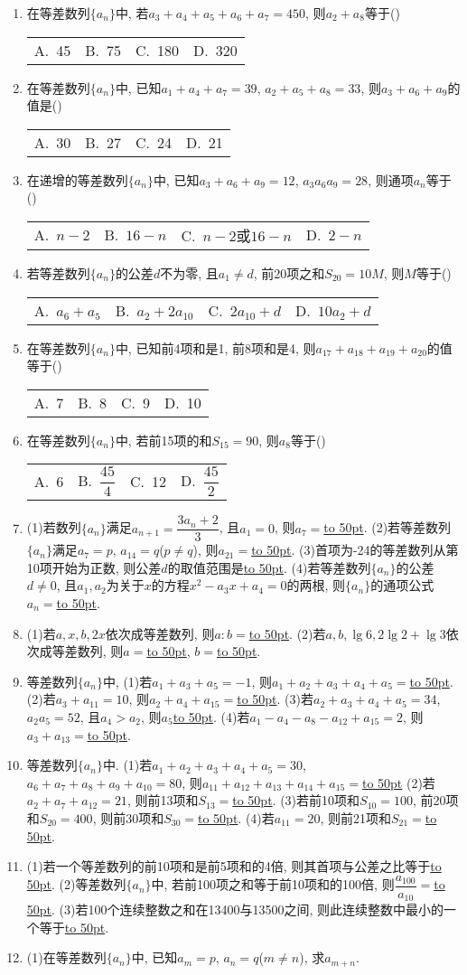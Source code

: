 \documentclass[10pt,a4paper]{article}
\newcommand{\blank}[1]{\underline{\hbox to #1pt{}}}
\newcommand{\fourch}[4]{\par\begin{tabular}{p{.23\textwidth}p{.23\textwidth}p{.23\textwidth}p{.23\textwidth}}
A.~#1 &B.~#2& C.~#3& D.~#4
\end{tabular}}
\begin{document}
\begin{enumerate}[1.]
\fourch{$2n-5$}{$2n-3$}{$2n-1$}{$2n+1$}
\item 在等差数列$\{a_n\}$中, 若$a_3+a_4+a_5+a_6+a_7=450$, 则$a_2+a_8$等于()
\fourch{45}{75}{180}{320}
\item 在等差数列$\{a_n\}$中, 已知$a_1+a_4+a_7=39$, $a_2+a_5+a_8=33$, 则$a_3+a_6+a_9$的值是()
\fourch{30}{27}{24}{21}
\item 在递增的等差数列$\{a_n\}$中, 已知$a_3+a_6+a_9=12$, $a_3a_6a_9=28$, 则通项$a_n$等于()
\fourch{$n-2$}{$16-n$}{$n-2$或$16-n$}{$2-n$}
\item 若等差数列$\{a_n\}$的公差$d$不为零, 且$a_1\ne d$, 前20项之和$S_{20}=10M$, 则$M$等于()
\fourch{$a_6+a_5$}{$a_2+2a_{10}$}{$2a_{10}+d$}{$10a_2+d$}
\item 在等差数列$\{a_n\}$中, 已知前4项和是1, 前8项和是4, 则$a_{17}+a_{18}+a_{19}+a_{20}$的值等于()
\fourch{7}{8}{9}{10}
\item 在等差数列$\{a_n\}$中, 若前15项的和$S_{15}=90$, 则$a_8$等于()
\fourch{6}{$\dfrac{45}4$}{12}{$\dfrac{45}2$}
\item (1)若数列$\{a_n\}$满足$a_{n+1}=\dfrac{3a_n+2}3$, 且$a_1=0$, 则$a_7=$\blank{50}.
(2)若等差数列$\{a_n\}$满足$a_7=p$, $a_{14}=q$($p\ne q$), 则$a_{21}=$\blank{50}.
(3)首项为-24的等差数列从第10项开始为正数, 则公差$d$的取值范围是\blank{50}.
(4)若等差数列$\{a_n\}$的公差$d\ne 0$, 且$a_1,a_2$为关于$x$的方程$x^2-a_3x+a_4=0$的两根, 则$\{a_n\}$的通项公式$a_n=$\blank{50}.
\item (1)若$a,x,b,2x$依次成等差数列, 则$a:b=$\blank{50}.
(2)若$a,b,\lg 6,2\lg 2+\lg 3$依次成等差数列, 则$a=$\blank{50}, $b=$\blank{50}.
\item 等差数列$\{a_n\}$中,
(1)若$a_1+a_3+a_5=-1$, 则$a_1+a_2+a_3+a_4+a_5=$\blank{50}.
(2)若$a_3+a_{11}=10$, 则$a_2+a_4+a_{15}=$\blank{50}.
(3)若$a_2+a_3+a_4+a_5=34$, $a_2a_5=52$, 且$a_4>a_2$, 则$a_5$\blank{50}.
(4)若$a_1-a_4-a_8-a_{12}+a_{15}=2$, 则$a_3+a_{13}=$\blank{50}.
\item 等差数列$\{a_n\}$中.
(1)若$a_1+a_2+a_3+a_4+a_5=30$, $a_6+a_7+a_8+a_9+a_{10}=80$, 则$a_{11}+a_{12}+a_{13}+a_{14}+a_{15}=$\blank{50}
(2)若$a_2+a_7+a_{12}=21$, 则前13项和$S_{13}=$\blank{50}.
(3)若前10项和$S_{10}=100$, 前20项和$S_{20}=400$, 则前30项和$S_{30}=$\blank{50}.
(4)若$a_{11}=20$, 则前21项和$S_{21}=$\blank{50}.
\item (1)若一个等差数列的前10项和是前5项和的4倍, 则其首项与公差之比等于\blank{50}.
(2)等差数列$\{a_n\}$中, 若前100项之和等于前10项和的100倍, 则$\dfrac{{a_{100}}}{{a_{10}}}=$\blank{50}.
(3)若100个连续整数之和在13400与13500之间, 则此连续整数中最小的一个等于\blank{50}.
\item (1)在等差数列$\{a_n\}$中, 已知$a_m=p$, $a_n=q$($m\ne n$), 求$a_{m+n}$.

\end{enumerate}
\end{document}

